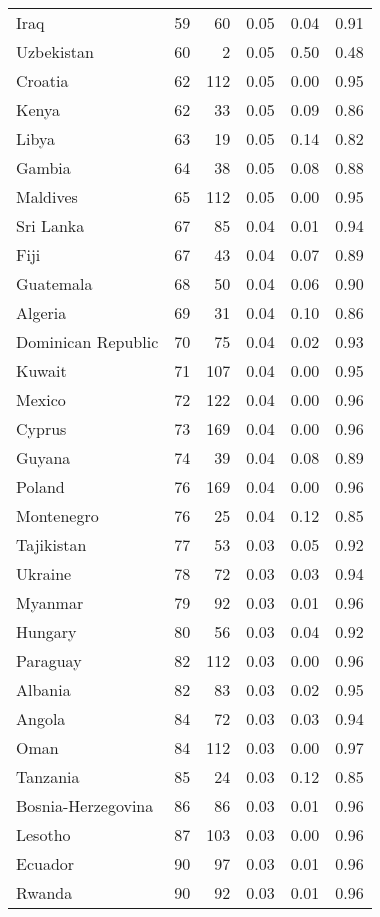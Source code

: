 \begin{longtable}[t]{lrrrrr}
Iraq & 59 & 60 & 0.05 & 0.04 & 0.91\\
Uzbekistan & 60 & 2 & 0.05 & 0.50 & 0.48\\
\addlinespace
Croatia & 62 & 112 & 0.05 & 0.00 & 0.95\\
Kenya & 62 & 33 & 0.05 & 0.09 & 0.86\\
Libya & 63 & 19 & 0.05 & 0.14 & 0.82\\
Gambia & 64 & 38 & 0.05 & 0.08 & 0.88\\
Maldives & 65 & 112 & 0.05 & 0.00 & 0.95\\
\addlinespace
Sri Lanka & 67 & 85 & 0.04 & 0.01 & 0.94\\
Fiji & 67 & 43 & 0.04 & 0.07 & 0.89\\
Guatemala & 68 & 50 & 0.04 & 0.06 & 0.90\\
Algeria & 69 & 31 & 0.04 & 0.10 & 0.86\\
Dominican Republic & 70 & 75 & 0.04 & 0.02 & 0.93\\
\addlinespace
Kuwait & 71 & 107 & 0.04 & 0.00 & 0.95\\
Mexico & 72 & 122 & 0.04 & 0.00 & 0.96\\
Cyprus & 73 & 169 & 0.04 & 0.00 & 0.96\\
Guyana & 74 & 39 & 0.04 & 0.08 & 0.89\\
Poland & 76 & 169 & 0.04 & 0.00 & 0.96\\
\addlinespace
Montenegro & 76 & 25 & 0.04 & 0.12 & 0.85\\
Tajikistan & 77 & 53 & 0.03 & 0.05 & 0.92\\
Ukraine & 78 & 72 & 0.03 & 0.03 & 0.94\\
Myanmar & 79 & 92 & 0.03 & 0.01 & 0.96\\
Hungary & 80 & 56 & 0.03 & 0.04 & 0.92\\
\addlinespace
Paraguay & 82 & 112 & 0.03 & 0.00 & 0.96\\
Albania & 82 & 83 & 0.03 & 0.02 & 0.95\\
Angola & 84 & 72 & 0.03 & 0.03 & 0.94\\
Oman & 84 & 112 & 0.03 & 0.00 & 0.97\\
Tanzania & 85 & 24 & 0.03 & 0.12 & 0.85\\
\addlinespace
Bosnia-Herzegovina & 86 & 86 & 0.03 & 0.01 & 0.96\\
Lesotho & 87 & 103 & 0.03 & 0.00 & 0.96\\
Ecuador & 90 & 97 & 0.03 & 0.01 & 0.96\\
Rwanda & 90 & 92 & 0.03 & 0.01 & 0.96\\

\end{longtable}
